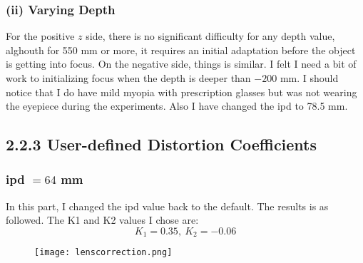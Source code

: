 \documentclass[11pt]{article}
\begin{document}
\subsubsection*{(ii) Varying Depth}
For the positive $z$ side, there is no significant difficulty for any depth value, alghouth for 550 mm or more, it requires an initial adaptation before the object is getting into focus. On the negative side, things is similar. I felt I need a bit of work to initializing focus when the depth is deeper than $-200$ mm. I should notice that I do have mild myopia with prescription glasses but was not wearing the eyepiece during the experiments. Also I have changed the ipd to 78.5 mm. 

\subsection*{2.2.3 User-defined Distortion Coefficients}
\subsubsection*{ipd $= 64$ mm}
In this part, I changed the ipd value back to the default. The results is as followed. The K1 and K2 values I chose are: \[K_1 = 0.35,\ K_2 = -0.06\]
\begin{figure}[h!t]
    \centering\texttt{[image: lenscorrection.png]}
\end{figure}
\end{document}
